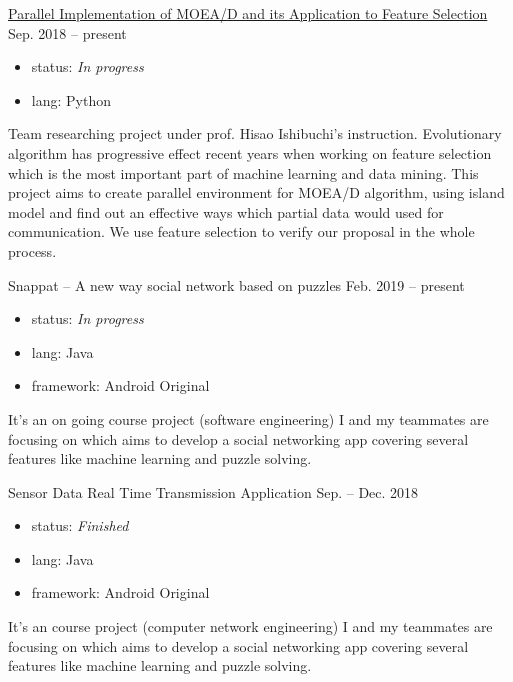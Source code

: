 \documentclass[hidelinks__VERSION__]{adamyi-cv}
\begin{document}
\begin{entrylist}


\entry
{\href{https://github.com/hackroid/pMOEA-D}{Parallel Implementation of MOEA/D and its Application to Feature Selection}}
{Sep. 2018 -- present}
{
\begin{itemize}
\item status: \emph{In progress}
\item lang: Python
\end{itemize}
Team researching project under prof. Hisao Ishibuchi's instruction. Evolutionary algorithm has progressive effect recent years when working on feature selection which is the most important part of machine learning and data mining. This project aims to create parallel environment for MOEA/D algorithm, using island model and find out an effective ways which partial data would used for communication. We use feature selection to verify our proposal in the whole process.
}


\entry
{Snappat -- A new way social network based on puzzles}
{Feb. 2019 -- present}
{
\begin{itemize}
\item status: \emph{In progress}
\item lang: Java
\item framework: Android Original
\end{itemize}
It's an on going course project (software engineering) I and my teammates are focusing on which aims to develop a social networking app covering several features like machine learning and puzzle solving.
}


\entry
{Sensor Data Real Time Transmission Application}
{Sep. -- Dec. 2018}
{
\begin{itemize}
\item status: \emph{Finished}
\item lang: Java
\item framework: Android Original
\end{itemize}
It's an course project (computer network engineering) I and my teammates are focusing on which aims to develop a social networking app covering several features like machine learning and puzzle solving.
}



\end{entrylist}
\end{document}
